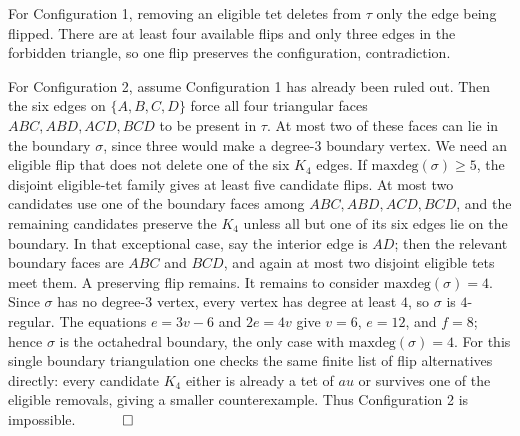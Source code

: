 \documentclass[12pt]{article}
\newcommand{\proofend}{$\quad \qed$}
\newcommand{\kw}{\mathrm}
\newcommand{\maxdeg}{\kw{maxdeg}}
\begin{document}
For Configuration 1, removing an eligible tet deletes from $\tau$ only
the edge being flipped.  There are at least four available flips and only
three edges in the forbidden triangle, so one flip preserves the
configuration, contradiction.

For Configuration 2, assume Configuration 1 has already been ruled out.
Then the six edges on $\{A,B,C,D\}$ force all four triangular faces
$ABC,ABD,ACD,BCD$ to be present in $\tau$.
At most two of these faces can lie in the boundary $\sigma$, since three
would make a degree-$3$ boundary vertex.
We need an eligible flip that does not delete one of the six $K_4$ edges.
If $\maxdeg(\sigma)\geq 5$, the disjoint eligible-tet family gives at
least five candidate flips.  At most two candidates use one of the
boundary faces among $ABC,ABD,ACD,BCD$, and the remaining candidates
preserve the $K_4$ unless all but one of its six edges lie on the
boundary.  In that exceptional case, say the interior edge is $AD$;
then the relevant boundary faces are $ABC$ and $BCD$, and again at most
two disjoint eligible tets meet them.  A preserving flip remains.
It remains to consider $\maxdeg(\sigma)=4$.
Since $\sigma$ has no degree-$3$ vertex, every vertex has degree at least
$4$, so $\sigma$ is $4$-regular.  The equations
$e=3v-6$ and $2e=4v$ give $v=6$, $e=12$, and $f=8$; hence $\sigma$ is
the octahedral boundary, the only case with $\maxdeg(\sigma)=4$.
For this single boundary triangulation one checks the same finite list of
flip alternatives directly: every candidate $K_4$ either is already a tet of
$	au$ or survives one of the eligible removals, giving a smaller
counterexample.  Thus Configuration 2 is impossible.
\proofend



\end{document}

